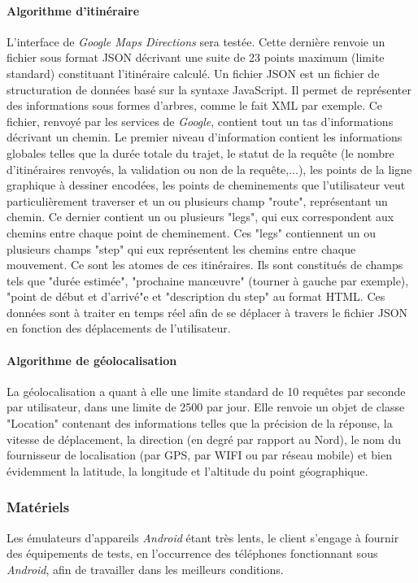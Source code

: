 {\paragraph{Algorithme d'itinéraire} L'interface de \textit{Google Maps Directions} sera testée. Cette dernière renvoie un fichier sous format JSON décrivant une suite de 23 points maximum (limite standard) constituant l'itinéraire calculé. Un fichier JSON est un fichier de structuration de données basé sur la syntaxe JavaScript. Il permet de représenter des informations sous formes d'arbres, comme le fait XML par exemple. Ce fichier, renvoyé par les services de \textit{Google}, contient tout un tas d'informations décrivant un chemin. Le premier niveau d'information contient les informations globales telles que la durée totale du trajet, le statut de la requête (le nombre d'itinéraires renvoyés, la validation ou non de la requête,...), les points de la ligne graphique à dessiner encodées, les points de cheminements que l'utilisateur veut particulièrement traverser et un ou plusieurs champ "route", représentant un chemin. Ce dernier contient un ou plusieurs "legs", qui eux correspondent aux chemins entre chaque point de cheminement. Ces "legs" contiennent un ou plusieurs champs "step" qui eux représentent les chemins entre chaque mouvement. Ce sont les atomes de ces itinéraires. Ils sont constitués de champs tels que "durée estimée", "prochaine manœuvre" (tourner à gauche par exemple), "point de début et d'arrivé"e et "description du step" au format HTML. Ces données sont à traiter en temps réel afin de se déplacer à travers le fichier JSON en fonction des déplacements de l'utilisateur.
\paragraph{Algorithme de géolocalisation} La géolocalisation a quant à elle une limite standard de 10 requêtes par seconde par utilisateur, dans une limite de 2500 par jour. Elle renvoie un objet de classe "Location" contenant des informations telles que la précision de la réponse, la vitesse de déplacement, la direction (en degré par rapport au Nord), le nom du fournisseur de localisation (par GPS, par WIFI ou par réseau mobile) et bien évidemment la latitude, la longitude et l'altitude du point géographique.

\subsubsection{Matériels} Les émulateurs d'appareils \textit{Android} étant très lents, le client s'engage à fournir des équipements de tests, en l'occurrence des téléphones fonctionnant sous \textit{Android}, afin de travailler dans les meilleurs conditions.\\

}
